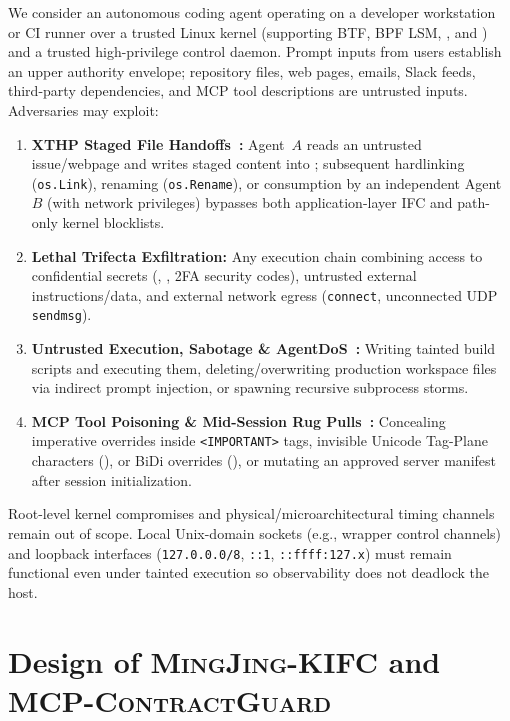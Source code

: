 \documentclass[10pt,twocolumn,letterpaper]{article}
\newcommand{\sys}{\textsc{MingJing-KIFC}}
\newcommand{\guard}{\textsc{MCP-ContractGuard}}
\newcommand{\code}[1]{\texttt{\small #1}}
\begin{document}
We consider an autonomous coding agent operating on a developer workstation or CI runner over a trusted Linux kernel (supporting BTF, BPF LSM, , and ) and a trusted high-privilege control daemon. Prompt inputs from users establish an upper authority envelope; repository files, web pages, emails, Slack feeds, third-party dependencies, and MCP tool descriptions are untrusted inputs. Adversaries may exploit:
\begin{enumerate}
  \item \textbf{XTHP Staged File Handoffs~\cite{xthp2026}:} Agent~$A$ reads an untrusted issue/webpage and writes staged content into ; subsequent hardlinking (\code{os.Link}), renaming (\code{os.Rename}), or consumption by an independent Agent~$B$ (with network privileges) bypasses both application-layer IFC and path-only kernel blocklists.
  \item \textbf{Lethal Trifecta Exfiltration:} Any execution chain combining access to confidential secrets (, , 2FA security codes), untrusted external instructions/data, and external network egress (\code{connect}, unconnected UDP \code{sendmsg}).
  \item \textbf{Untrusted Execution, Sabotage \& AgentDoS~\cite{agentdos2026}:} Writing tainted build scripts and executing them, deleting/overwriting production workspace files via indirect prompt injection, or spawning recursive subprocess storms.
  \item \textbf{MCP Tool Poisoning \& Mid-Session Rug Pulls~\cite{mcpinspect2026,agentbound2026}:} Concealing imperative overrides inside \code{<IMPORTANT>} tags, invisible Unicode Tag-Plane characters (), or BiDi overrides (), or mutating an approved server manifest after session initialization.
\end{enumerate}

Root-level kernel compromises and physical/microarchitectural timing channels remain out of scope. Local Unix-domain sockets (e.g., wrapper control channels) and loopback interfaces (\code{127.0.0.0/8}, \code{::1}, \code{::ffff:127.x}) must remain functional even under tainted execution so observability does not deadlock the host.

\section{Design of \sys{} and \guard{}}
\label{sec:design}
\end{document}
